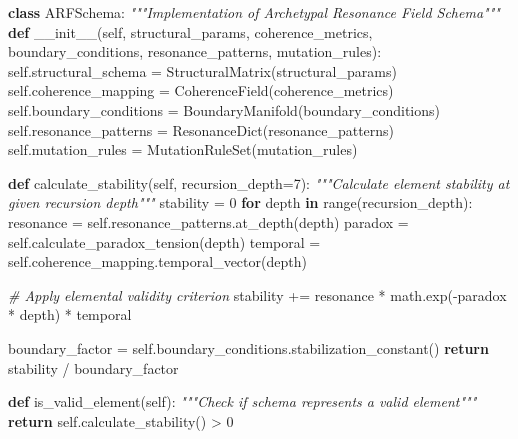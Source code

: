 \documentclass[
]{article}
\newenvironment{Shaded}{}{}
\newcommand{\BuiltInTok}[1]{\textcolor[rgb]{0.00,0.50,0.00}{#1}}
\newcommand{\CommentTok}[1]{\textcolor[rgb]{0.38,0.63,0.69}{\textit{#1}}}
\newcommand{\ControlFlowTok}[1]{\textcolor[rgb]{0.00,0.44,0.13}{\textbf{#1}}}
\newcommand{\DecValTok}[1]{\textcolor[rgb]{0.25,0.63,0.44}{#1}}
\newcommand{\FunctionTok}[1]{\textcolor[rgb]{0.02,0.16,0.49}{#1}}
\newcommand{\KeywordTok}[1]{\textcolor[rgb]{0.00,0.44,0.13}{\textbf{#1}}}
\newcommand{\NormalTok}[1]{#1}
\newcommand{\OperatorTok}[1]{\textcolor[rgb]{0.40,0.40,0.40}{#1}}
\newcommand{\VariableTok}[1]{\textcolor[rgb]{0.10,0.09,0.49}{#1}}
\begin{document}
\begin{Shaded}
\begin{Highlighting}[]
\KeywordTok{class}\NormalTok{ ARFSchema:}
    \CommentTok{"""Implementation of Archetypal Resonance Field Schema"""}
    \KeywordTok{def} \FunctionTok{\_\_init\_\_}\NormalTok{(}\VariableTok{self}\NormalTok{, structural\_params, coherence\_metrics, boundary\_conditions,}
\NormalTok{                 resonance\_patterns, mutation\_rules):}
        \VariableTok{self}\NormalTok{.structural\_schema }\OperatorTok{=}\NormalTok{ StructuralMatrix(structural\_params)}
        \VariableTok{self}\NormalTok{.coherence\_mapping }\OperatorTok{=}\NormalTok{ CoherenceField(coherence\_metrics)}
        \VariableTok{self}\NormalTok{.boundary\_conditions }\OperatorTok{=}\NormalTok{ BoundaryManifold(boundary\_conditions)}
        \VariableTok{self}\NormalTok{.resonance\_patterns }\OperatorTok{=}\NormalTok{ ResonanceDict(resonance\_patterns)}
        \VariableTok{self}\NormalTok{.mutation\_rules }\OperatorTok{=}\NormalTok{ MutationRuleSet(mutation\_rules)}

    \KeywordTok{def}\NormalTok{ calculate\_stability(}\VariableTok{self}\NormalTok{, recursion\_depth}\OperatorTok{=}\DecValTok{7}\NormalTok{):}
        \CommentTok{"""Calculate element stability at given recursion depth"""}
\NormalTok{        stability }\OperatorTok{=} \DecValTok{0}
        \ControlFlowTok{for}\NormalTok{ depth }\KeywordTok{in} \BuiltInTok{range}\NormalTok{(recursion\_depth):}
\NormalTok{            resonance }\OperatorTok{=} \VariableTok{self}\NormalTok{.resonance\_patterns.at\_depth(depth)}
\NormalTok{            paradox }\OperatorTok{=} \VariableTok{self}\NormalTok{.calculate\_paradox\_tension(depth)}
\NormalTok{            temporal }\OperatorTok{=} \VariableTok{self}\NormalTok{.coherence\_mapping.temporal\_vector(depth)}

            \CommentTok{\# Apply elemental validity criterion}
\NormalTok{            stability }\OperatorTok{+=}\NormalTok{ resonance }\OperatorTok{*}\NormalTok{ math.exp(}\OperatorTok{{-}}\NormalTok{paradox }\OperatorTok{*}\NormalTok{ depth) }\OperatorTok{*}\NormalTok{ temporal}

\NormalTok{        boundary\_factor }\OperatorTok{=} \VariableTok{self}\NormalTok{.boundary\_conditions.stabilization\_constant()}
        \ControlFlowTok{return}\NormalTok{ stability }\OperatorTok{/}\NormalTok{ boundary\_factor}

    \KeywordTok{def}\NormalTok{ is\_valid\_element(}\VariableTok{self}\NormalTok{):}
        \CommentTok{"""Check if schema represents a valid element"""}
        \ControlFlowTok{return} \VariableTok{self}\NormalTok{.calculate\_stability() }\OperatorTok{\textgreater{}} \DecValTok{0}


\end{Highlighting}
\end{Shaded}
\end{document}
